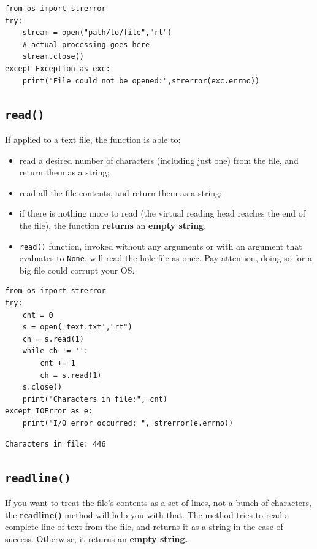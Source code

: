 \documentclass[11pt]{article}
\begin{document}
\begin{verbatim}
from os import strerror
try: 
	stream = open("path/to/file","rt")
	# actual processing goes here
	stream.close()
except Exception as exc:
	print("File could not be opened:",strerror(exc.errno))
\end{verbatim}

\subsection{\texttt{read()}}
\label{sec:org13847e2}
If applied to a text file, the function is able to:

\begin{itemize}
\item read a desired number of characters (including just one) from the
file, and return them as a string;
\item read all the file contents, and return them as a string;
\item if there is nothing more to read (the virtual reading head reaches
the end of the file), the function \textbf{returns} an \textbf{empty string}.
\item \texttt{read()} function, invoked without any arguments or with an argument
that evaluates to \texttt{None}, will read the hole file as once. Pay
attention, doing so for a big file could corrupt your OS.
\end{itemize}


\begin{verbatim}
from os import strerror
try:
	cnt = 0
	s = open('text.txt',"rt")
	ch = s.read(1)
	while ch != '':
		cnt += 1
		ch = s.read(1)
	s.close()
	print("Characters in file:", cnt)
except IOError as e:
	print("I/O error occurred: ", strerror(e.errno))
\end{verbatim}

\begin{verbatim}
Characters in file: 446
\end{verbatim}

\subsection{\texttt{readline()}}
\label{sec:org2cfa526}
If you want to treat the file’s contents as a set of lines, not a
bunch of characters, the \textbf{readline()} method will help you with that.
The method tries to read a complete line of text from the file, and
returns it as a string in the case of success. Otherwise, it returns
an \textbf{empty string.}
\end{document}
